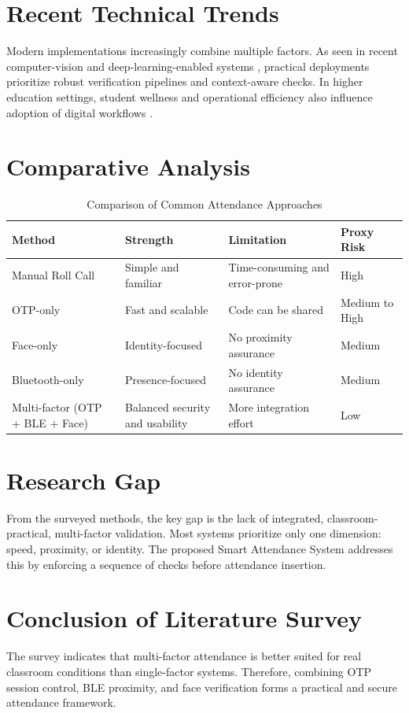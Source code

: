 \section{Recent Technical Trends}
Modern implementations increasingly combine multiple factors. As seen in recent computer-vision and deep-learning-enabled systems \cite{wang2022lip,liu2024camouflage}, practical deployments prioritize robust verification pipelines and context-aware checks. In higher education settings, student wellness and operational efficiency also influence adoption of digital workflows \cite{slavin2014medical}.

\section{Comparative Analysis}
\begin{table}[H]
\centering
\caption{Comparison of Common Attendance Approaches}
\label{c2:tab1}
\begin{tabular}{|L{3.2cm}|L{3.0cm}|L{3.0cm}|L{3.0cm}|}
\hline
\textbf{Method} & \textbf{Strength} & \textbf{Limitation} & \textbf{Proxy Risk}\\
\hline
Manual Roll Call & Simple and familiar & Time-consuming and error-prone & High\\
\hline
OTP-only & Fast and scalable & Code can be shared & Medium to High\\
\hline
Face-only & Identity-focused & No proximity assurance & Medium\\
\hline
Bluetooth-only & Presence-focused & No identity assurance & Medium\\
\hline
Multi-factor (OTP + BLE + Face) & Balanced security and usability & More integration effort & Low\\
\hline
\end{tabular}
\end{table}

\section{Research Gap}
From the surveyed methods, the key gap is the lack of integrated, classroom-practical, multi-factor validation. Most systems prioritize only one dimension: speed, proximity, or identity. The proposed Smart Attendance System addresses this by enforcing a sequence of checks before attendance insertion.

\section{Conclusion of Literature Survey}
The survey indicates that multi-factor attendance is better suited for real classroom conditions than single-factor systems. Therefore, combining OTP session control, BLE proximity, and face verification forms a practical and secure attendance framework.

